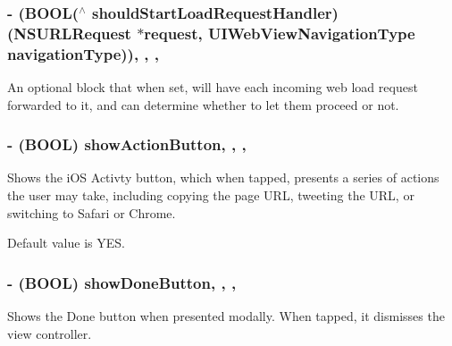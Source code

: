 \subsubsection[{should\+Start\+Load\+Request\+Handler}]{\setlength{\rightskip}{0pt plus 5cm}-\/ (B\+O\+O\+L($^\wedge$ should\+Start\+Load\+Request\+Handler) (N\+S\+U\+R\+L\+Request $\ast$request, U\+I\+Web\+View\+Navigation\+Type navigation\+Type))\hspace{0.3cm}{\ttfamily [read]}, {\ttfamily [write]}, {\ttfamily [nonatomic]}, {\ttfamily [copy]}}\label{interface_t_o_web_view_controller_a030a5b87b4ba4fb31e7bdbe10656f62a}
An optional block that when set, will have each incoming web load request forwarded to it, and can determine whether to let them proceed or not. \hypertarget{interface_t_o_web_view_controller_a6a44854475f43f7e3e81a6805f5d67af}{}
\subsubsection[{show\+Action\+Button}]{\setlength{\rightskip}{0pt plus 5cm}-\/ (B\+O\+O\+L) show\+Action\+Button\hspace{0.3cm}{\ttfamily [read]}, {\ttfamily [write]}, {\ttfamily [nonatomic]}, {\ttfamily [assign]}}\label{interface_t_o_web_view_controller_a6a44854475f43f7e3e81a6805f5d67af}
Shows the i\+O\+S \textquotesingle{}Activty\textquotesingle{} button, which when tapped, presents a series of actions the user may take, including copying the page U\+R\+L, tweeting the U\+R\+L, or switching to Safari or Chrome.

Default value is Y\+E\+S. \hypertarget{interface_t_o_web_view_controller_a529bbbcc8ff2874152516dd6ab4e5db2}{}
\subsubsection[{show\+Done\+Button}]{\setlength{\rightskip}{0pt plus 5cm}-\/ (B\+O\+O\+L) show\+Done\+Button\hspace{0.3cm}{\ttfamily [read]}, {\ttfamily [write]}, {\ttfamily [nonatomic]}, {\ttfamily [assign]}}\label{interface_t_o_web_view_controller_a529bbbcc8ff2874152516dd6ab4e5db2}
Shows the Done button when presented modally. When tapped, it dismisses the view controller.

